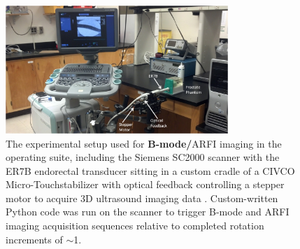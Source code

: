 \begin{figure}
\centering
\includegraphics[width=0.75\textwidth]{figs/setup_annotated.png}
\caption{The experimental setup used for \textbf{B-mode/}ARFI imaging in the
    operating suite, including the Siemens SC2000 scanner with the ER7B
    endorectal transducer sitting in a custom cradle of a CIVCO
    Micro-Touch\texttrademark stabilizer with optical feedback controlling a
    stepper motor to acquire 3D ultrasound imaging data \invivo.
    Custom-written Python code was run on the scanner to trigger B-mode and
    ARFI imaging acquisition sequences relative to completed rotation
    increments of $\sim$1\degree.}
\label{fig:setup_annotated} 
\end{figure}
